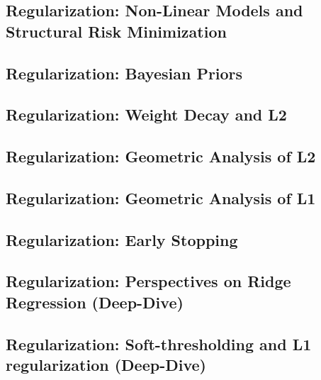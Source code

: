 \subsection{Regularization: Non-Linear Models and Structural Risk Minimization}


\subsection{Regularization: Bayesian Priors}


\subsection{Regularization: Weight Decay and L2}


\subsection{Regularization: Geometric Analysis of L2}


\subsection{Regularization: Geometric Analysis of L1}


\subsection{Regularization: Early Stopping}


\subsection{Regularization: Perspectives on Ridge Regression (Deep-Dive)}


\subsection{Regularization: Soft-thresholding and L1 regularization (Deep-Dive)}


%







